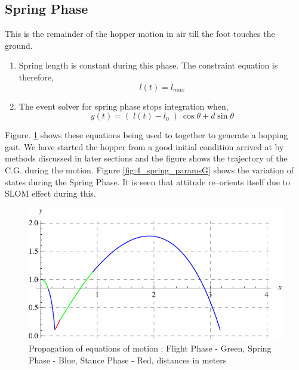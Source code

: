 \subsection*{Spring Phase}
This is the remainder of the hopper motion in air till the foot touches the ground.
\begin{enumerate}
  \item
  Spring length is constant during this phase. The constraint equation is therefore,
  \begin{equation}
  l(t) = l_{max}
  \end{equation}
  \item
  The event solver for spring phase stops integration when,
  \begin{equation}
  y(t) = (\;l(t) - l_0\;)\:\cos \theta + d \sin \theta
  \end{equation}
\end{enumerate}
Figure. \ref{fig:4_eqn_prop} shows these equations being used to together to generate a hopping gait. We 
have started the hopper from a good initial condition arrived at by methods discussed in later sections 
and the figure shows the trajectory of the C.G. during the motion. Figure \ref{fig:4_spring_paramsG} shows 
the variation of states during the Spring Phase. It is seen that attitude re--orients itself due to SLOM 
effect during this.
\begin{figure}[!htp]
\centering
\includegraphics[scale=1.5]{fig/plotG.pdf}
\caption[Propagation of equations of motion]{Propagation of equations of motion : Flight Phase - Green, Spring Phase - Blue, Stance Phase - Red, distances in meters}
\label{fig:4_eqn_prop}
\end{figure}

